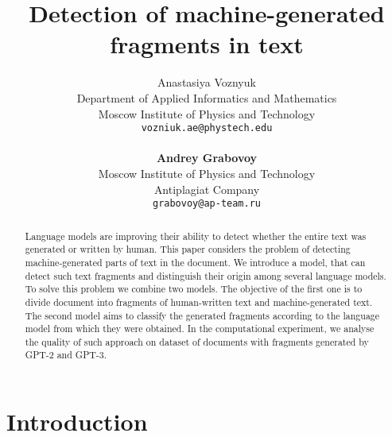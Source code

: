 \documentclass{article}
\title{Detection of machine-generated fragments in text}
\author{ Anastasiya Voznyuk \\
	Department of Applied Informatics and Mathematics\\
	Moscow Institute of Physics and Technology\\
	\texttt{vozniuk.ae@phystech.edu} \\
    \\
    \textbf{Andrey Grabovoy} \\
	Moscow Institute of Physics and Technology\\
    Antiplagiat Company \\
	\texttt{grabovoy@ap-team.ru}}
\date{}
\begin{document}
\maketitle

\begin{abstract}
	Language models are improving their ability to detect whether the entire text was generated or written by human. This paper considers the problem of detecting machine-generated parts of text in the document. We introduce a model, that can detect such text fragments and distinguish their origin among several language models. To solve this problem we combine two models. The objective of the first one is to divide document into fragments of human-written text and machine-generated text. The second model aims to classify the generated fragments according to the language model from which they were obtained. In the computational experiment, we analyse the quality of such approach on dataset of documents with fragments generated by GPT-2 and GPT-3.
\end{abstract}



\section{Introduction}
\end{document}
